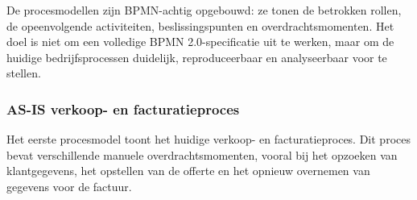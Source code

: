 De procesmodellen zijn BPMN-achtig opgebouwd: ze tonen de betrokken rollen, de opeenvolgende activiteiten, beslissingspunten en overdrachtsmomenten. Het doel is niet om een volledige BPMN 2.0-specificatie uit te werken, maar om de huidige bedrijfsprocessen duidelijk, reproduceerbaar en analyseerbaar voor te stellen.

\subsubsection{AS-IS verkoop- en facturatieproces}

Het eerste procesmodel toont het huidige verkoop- en facturatieproces. Dit proces bevat verschillende manuele overdrachtsmomenten, vooral bij het opzoeken van klantgegevens, het opstellen van de offerte en het opnieuw overnemen van gegevens voor de factuur.

